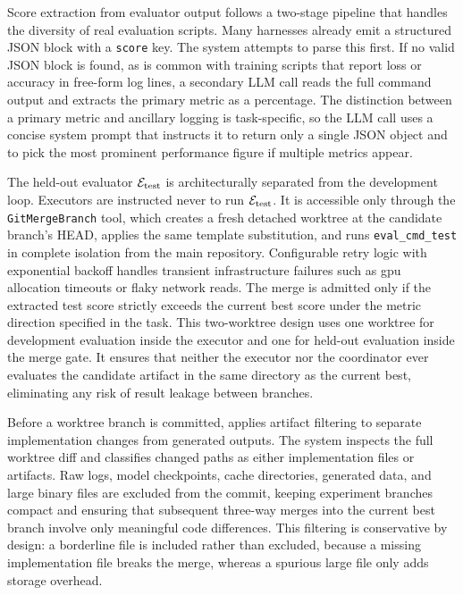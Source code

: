 Score extraction from evaluator output follows a two-stage pipeline
that handles the diversity of real evaluation scripts. Many harnesses
already emit a structured JSON block with a \texttt{score} key. The system
attempts to parse this first. If no valid JSON block is found, as is
common with training scripts that report loss or accuracy in free-form
log lines, a secondary LLM call reads the full command output and
extracts the primary metric as a percentage. The distinction between a
primary metric and ancillary logging is task-specific, so the LLM call
uses a concise system prompt that instructs it to return only a single
JSON object and to pick the most prominent performance figure if multiple
metrics appear.

The held-out evaluator $\mathcal{E}_{\mathrm{test}}$ is architecturally separated from
the development loop. Executors are instructed never to run $\mathcal{E}_{\mathrm{test}}$.
It is accessible only through the \texttt{GitMergeBranch} tool, which
creates a fresh detached worktree at the candidate branch's HEAD, applies
the same template substitution, and runs \texttt{eval\_cmd\_test} in
complete isolation from the main repository. Configurable retry logic
with exponential backoff handles transient infrastructure failures such as
gpu allocation timeouts or flaky network reads. The merge is admitted only
if the extracted test score strictly exceeds the current best score under
the metric direction specified in the task. This two-worktree design uses one
worktree for development evaluation inside the executor and one for held-out
evaluation inside the merge gate. It ensures that neither the executor nor
the coordinator
ever evaluates the candidate artifact in the same directory as the current best,
eliminating any risk of result leakage between branches.

Before a worktree branch is committed, \arbor{} applies artifact filtering
to separate implementation changes from generated outputs. The system
inspects the full worktree diff and classifies changed paths as either
implementation files or artifacts. Raw logs, model checkpoints,
cache directories, generated data, and large binary files are excluded
from the commit, keeping experiment branches compact and ensuring that
subsequent three-way merges into the current best branch involve only meaningful code
differences. This filtering is conservative by design: a borderline file
is included rather than excluded, because a missing implementation file
breaks the merge, whereas a spurious large file only adds storage overhead.

